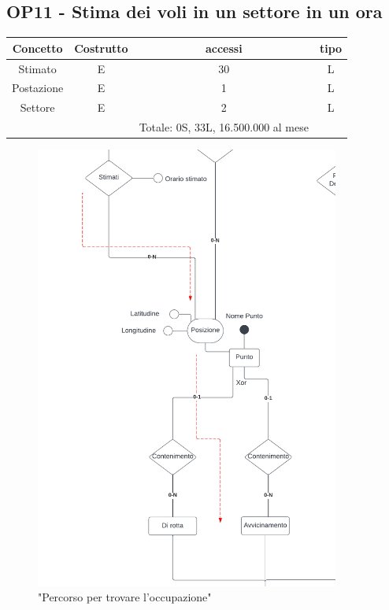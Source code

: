     \subsection*{OP11 - Stima dei voli in un settore in un ora}
    \begin{table}[H]
    \centering
    \begin{tabular}{|c|c|c|c|}
    \hline
    \rowcolor{green!70!black!80}
    \textbf{Concetto} & \textbf{Costrutto} & \textbf{accessi} & \textbf{tipo}\\
    \hline
    Stimato & E & 30 & L \\
    Postazione & E & 1 & L \\
    Settore & E & 2 & L \\
    & & Totale: 0S, 33L, 16.500.000 al mese &\\
    \hline
    \end{tabular}
    \end{table}
    \begin{figure}[H]
      \centering
      \includegraphics[width=10cm]{figures/BasicControllerarrowsp1.pdf}
      \caption{"Percorso per trovare l'occupazione"}
    \end{figure}
    

